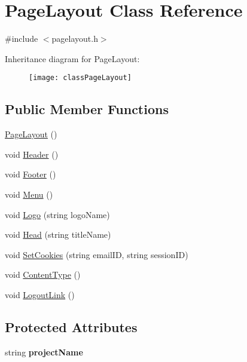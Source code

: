 \hypertarget{classPageLayout}{\section{\-Page\-Layout \-Class \-Reference}
\label{classPageLayout}
}


{\ttfamily \#include $<$pagelayout.\-h$>$}

\-Inheritance diagram for \-Page\-Layout\-:\begin{figure}[H]
\begin{center}
\leavevmode
\texttt{[image: classPageLayout]}
\end{center}
\end{figure}
\subsection*{\-Public \-Member \-Functions}
\begin{DoxyCompactItemize}
\item 
\hyperlink{classPageLayout_ab3f470f006f9820610d9aaebe5b8427b}{\-Page\-Layout} ()
\item 
void \hyperlink{classPageLayout_a7726061f0653245f644a05807fa92472}{\-Header} ()
\item 
void \hyperlink{classPageLayout_a68aa868a8868b12964f161838b5f814c}{\-Footer} ()
\item 
void \hyperlink{classPageLayout_a49af1dca286bbee9432192a7b3c00332}{\-Menu} ()
\item 
void \hyperlink{classPageLayout_ae60235c6af48e3ebbc6343d02456da0c}{\-Logo} (string logo\-Name)
\item 
void \hyperlink{classPageLayout_ae50907d56f0ba7a85f7ccfdeafa45bcc}{\-Head} (string title\-Name)
\item 
void \hyperlink{classPageLayout_a449b4dde24cf3dc10299dc3c7bfc0e9c}{\-Set\-Cookies} (string email\-I\-D, string session\-I\-D)
\item 
void \hyperlink{classPageLayout_af1d13a4aa259cf62ccf92549b696de32}{\-Content\-Type} ()
\item 
void \hyperlink{classPageLayout_abe2cfa43480c1b48125b3d618cab7831}{\-Logout\-Link} ()
\end{DoxyCompactItemize}
\subsection*{\-Protected \-Attributes}
\begin{DoxyCompactItemize}
\item 
\hypertarget{classPageLayout_a8a3c1ddc422df2556fbc95d0cd575a05}{string {\bfseries project\-Name}}\label{classPageLayout_a8a3c1ddc422df2556fbc95d0cd575a05}

\end{DoxyCompactItemize}


